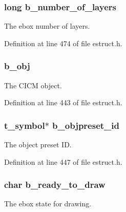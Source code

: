 \hypertarget{struct__ebox_a84105957ca11a224cf734f350fb23ac9}{
\subsubsection[{b\-\_\-number\-\_\-of\-\_\-layers}]{\setlength{\rightskip}{0pt plus 5cm}long b\-\_\-number\-\_\-of\-\_\-layers}}\label{struct__ebox_a84105957ca11a224cf734f350fb23ac9}
The ebox number of layers. 

Definition at line 474 of file estruct.\-h.

\hypertarget{struct__ebox_a384a670299e98768527fbe457de9a38a}{
\subsubsection[{b\-\_\-obj}]{ b\-\_\-obj}}\label{struct__ebox_a384a670299e98768527fbe457de9a38a}
The C\-I\-C\-M object. 

Definition at line 443 of file estruct.\-h.

\hypertarget{struct__ebox_adc377263d208d1051f4a0997868b1155}{
\subsubsection[{b\-\_\-objpreset\-\_\-id}]{\setlength{\rightskip}{0pt plus 5cm}t\-\_\-symbol$\ast$ b\-\_\-objpreset\-\_\-id}}\label{struct__ebox_adc377263d208d1051f4a0997868b1155}
The object preset I\-D. 

Definition at line 447 of file estruct.\-h.

\hypertarget{struct__ebox_a234ea03e103bd45f5fa1d27b8e69b5dd}{
\subsubsection[{b\-\_\-ready\-\_\-to\-\_\-draw}]{\setlength{\rightskip}{0pt plus 5cm}char b\-\_\-ready\-\_\-to\-\_\-draw}}\label{struct__ebox_a234ea03e103bd45f5fa1d27b8e69b5dd}
The ebox state for drawing. 

